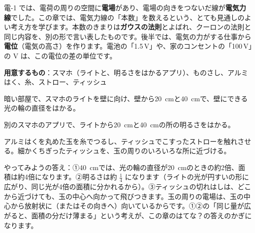 \noindent 電-1 では、電荷の周りの空間に\textbf{電場}があり、電場の向きをつないだ線が\textbf{電気力線}でした。この章では、電気力線の「本数」を数えるという、とても見通しのよい考え方を学びます。本数のきまりは\textbf{ガウスの法則}とよばれ、クーロンの法則と同じ内容を、別の形で言い表したものです。後半では、電気の力がする仕事から\textbf{電位}（電気の高さ）を作ります。電池の「1.5\,V」や、家のコンセントの「100\,V」の V は、この電位の差の単位です。

\begin{yattemiyou}
\textbf{用意するもの}：スマホ（ライトと、明るさをはかるアプリ）、ものさし、アルミはく、糸、ストロー、ティッシュ\par\vspace{2pt}
\noindent\begin{minipage}[c]{0.64\linewidth}
\begin{enumerate}[label={\bkcircled[bkGreen]{\arabic*}}, leftmargin=2.4\zw, itemsep=1pt, topsep=0pt]
\item 暗い部屋で、スマホのライトを壁に向け、壁から\qty{20}{cm}と\qty{40}{cm}で、壁にできる光の輪の直径をはかる。
\item 別のスマホのアプリで、ライトから\qty{20}{cm}と\qty{40}{cm}の所の明るさをはかる。
\item アルミはくを丸めた玉を糸でつるし、ティッシュでこすったストローを触れさせる。細かくちぎったティッシュを、玉の周りのいろいろな所に近づける。
\end{enumerate}
\end{minipage}\hfill
\begin{minipage}[c]{0.33\linewidth}\centering
{}
\end{minipage}
\end{yattemiyou}

\noindent やってみようの答え：①\qty{40}{cm}では、光の輪の直径が\qty{20}{cm}のときの約2倍、面積は約4倍になります。②明るさは約 $\tfrac14$ になります（ライトの光が円すいの形に広がり、同じ光が4倍の面積に分かれるから）。③ティッシュの切れはしは、どこから近づけても、玉の中心へ向かって飛びつきます。玉の周りの電場は、玉の中心から放射状に（またはその向きへ）向いているからです。①②の「同じ量が広がると、面積の分だけ薄まる」という考えが、この章のはてな？の答えのかぎになります。

